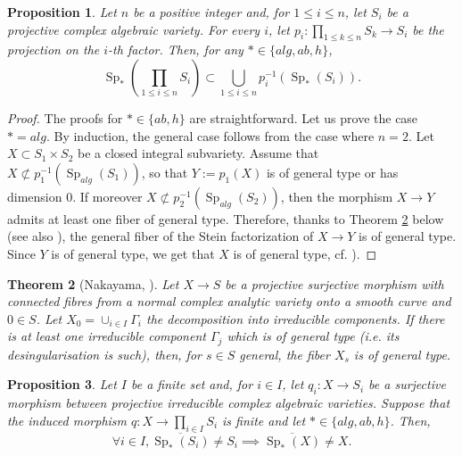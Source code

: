 \documentclass[11pt,letterpaper]{amsart}
\theoremstyle{plain}
\newtheorem{thm}{Theorem}[section]
\newtheorem{prop}[thm]{Proposition}
\DeclareMathOperator{\Sp}{Sp}
\begin{document}
\begin{prop}\label{product-special-sets}
Let $n$ be a positive integer and, for $1 \leq i \leq n$, let $S_i$ be a projective complex algebraic variety. For every $i$, let $p_i \colon \prod_{1 \leq k \leq n} S_k \rightarrow S_i$ be the projection on the $i$-th factor. Then, for any $* \in  \{ alg, ab, h\} $,
\[  \Sp_*(\prod_{1 \leq i \leq n} S_i) \subset \bigcup_{1 \leq i \leq n} p_i^{-1} \left(\Sp_*(S_i) \right).\]
\end{prop}

\begin{proof}
The proofs for $* \in  \{ ab, h\} $ are straightforward. Let us prove the case $* = alg$. By induction, the general case follows from the case where $n = 2$. Let $X \subset S_1 \times S_2$ be a closed integral subvariety. Assume that $X \not \subset p_1^{-1}\left(\Sp_{alg}(S_1) \right)$, so that $Y := p_1(X)$ is of general type or has dimension $0$. If moreover $X \not \subset p_2^{-1}\left(\Sp_{alg}(S_2) \right)$, then the morphism $X \to Y$ admits at least one fiber of general type. Therefore, thanks to Theorem \ref{Nakayama} below (see also \cite[Theorem 3.9]{Bruni-relative-Lang}), the general fiber of the Stein factorization of $X \to Y$ is of general type. Since $Y$ is of general type, we get that $X$ is of general type, cf. \cite[Corollary IV]{Viehweg83}).
\end{proof}

\begin{thm}[Nakayama, {\cite[Theorem VI.4.3]{Nakayama}}]\label{Nakayama}
Let $X \to S$ be a projective surjective morphism with connected fibres from a normal complex analytic variety onto a smooth curve and $0 \in S$. Let $X_0= \cup_{i\in I} \Gamma_i$ the decomposition into irreducible components. If there is at least one irreducible component $\Gamma_j$ which is of general type (i.e. its desingularisation is such), then, for $s \in S$ general, the fiber $X_s$ is of general type.
\end{thm}

\begin{prop}\label{lemma-special-sets}
Let $I$ be a finite set and, for $i \in I$, let $q_i \colon X \to S_i$ be a surjective morphism between projective irreducible complex algebraic varieties. Suppose that the induced morphism $q \colon X \to \prod_{i \in I} S_i$ is finite and let $* \in  \{alg, ab, h\} $. Then,
\[ \forall i \in I,  \overline{\Sp_*(S_i)} \neq S_i \implies \overline{\Sp_*(X)} \neq X.\]
\end{prop}
\end{document}
